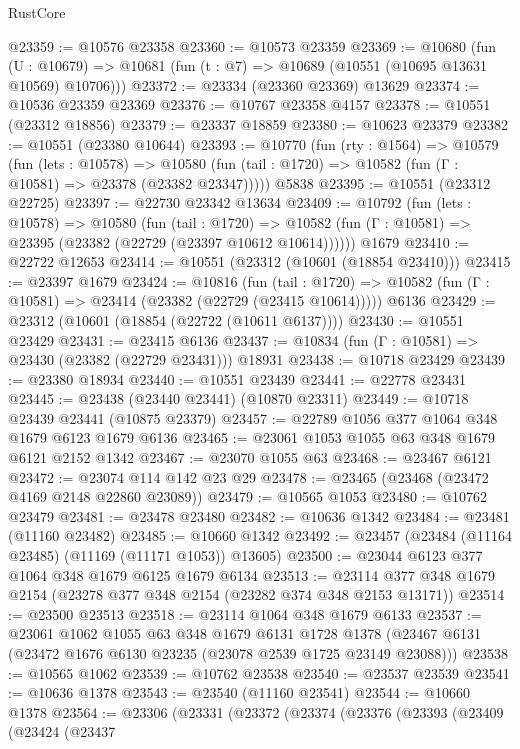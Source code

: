 \begin{lexlean}{RustCore}
\begin{coremodule}
@23359 := @10576 @23358
@23360 := @10573 @23359
@23369 := @10680
    (fun (U : @10679) => @10681 (fun (t : @7) => @10689 (@10551 (@10695 @13631 @10569) @10706)))
@23372 := @23334 (@23360 @23369) @13629
@23374 := @10536 @23359 @23369
@23376 := @10767 @23358 @4157
@23378 := @10551 (@23312 @18856)
@23379 := @23337 @18859
@23380 := @10623 @23379
@23382 := @10551 (@23380 @10644)
@23393 := @10770
    (fun (rty : @1564) =>
    @10579
      (fun (lets : @10578) =>
      @10580 (fun (tail : @1720) => @10582 (fun (Γ : @10581) => @23378 (@23382 @23347)))))
    @5838
@23395 := @10551 (@23312 @22725)
@23397 := @22730 @23342 @13634
@23409 := @10792
    (fun (lets : @10578) =>
    @10580
      (fun (tail : @1720) =>
      @10582 (fun (Γ : @10581) => @23395 (@23382 (@22729 (@23397 @10612 @10614))))))
    @1679
@23410 := @22722 @12653
@23414 := @10551 (@23312 (@10601 (@18854 @23410)))
@23415 := @23397 @1679
@23424 := @10816
    (fun (tail : @1720) => @10582 (fun (Γ : @10581) => @23414 (@23382 (@22729 (@23415 @10614)))))
    @6136
@23429 := @23312 (@10601 (@18854 (@22722 (@10611 @6137))))
@23430 := @10551 @23429
@23431 := @23415 @6136
@23437 := @10834 (fun (Γ : @10581) => @23430 (@23382 (@22729 @23431))) @18931
@23438 := @10718 @23429
@23439 := @23380 @18934
@23440 := @10551 @23439
@23441 := @22778 @23431
@23445 := @23438 (@23440 @23441) (@10870 @23311)
@23449 := @10718 @23439 @23441 (@10875 @23379)
@23457 := @22789 @1056 @377 @1064 @348 @1679 @6123 @1679 @6136
@23465 := @23061 @1053 @1055 @63 @348 @1679 @6121 @2152 @1342
@23467 := @23070 @1055 @63
@23468 := @23467 @6121
@23472 := @23074 @114 @142 @23 @29
@23478 := @23465 (@23468 (@23472 @4169 @2148 @22860 @23089))
@23479 := @10565 @1053
@23480 := @10762 @23479
@23481 := @23478 @23480
@23482 := @10636 @1342
@23484 := @23481 (@11160 @23482)
@23485 := @10660 @1342
@23492 := @23457 (@23484 (@11164 @23485) (@11169 (@11171 @1053)) @13605)
@23500 := @23044 @6123 @377 @1064 @348 @1679 @6125 @1679 @6134
@23513 := @23114 @377 @348 @1679 @2154 (@23278 @377 @348 @2154 (@23282 @374 @348 @2153 @13171))
@23514 := @23500 @23513
@23518 := @23114 @1064 @348 @1679 @6133
@23537 := @23061
    @1062
    @1055
    @63
    @348
    @1679
    @6131
    @1728
    @1378
    (@23467 @6131 (@23472 @1676 @6130 @23235 (@23078 @2539 @1725 @23149 @23088)))
@23538 := @10565 @1062
@23539 := @10762 @23538
@23540 := @23537 @23539
@23541 := @10636 @1378
@23543 := @23540 (@11160 @23541)
@23544 := @10660 @1378
@23564 := @23306
    (@23331
      (@23372
        (@23374
          (@23376
            (@23393
              (@23409
                (@23424
                  (@23437

\end{coremodule}
\end{lexlean}
